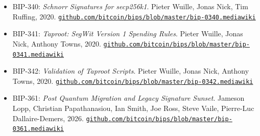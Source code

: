 \documentclass[11pt, twoside, openright]{book}
\begin{document}
\begin{itemize}[leftmargin=1.5em, itemsep=4pt]
  \item BIP-340: \textit{Schnorr Signatures for secp256k1}. Pieter Wuille, Jonas Nick, Tim Ruffing, 2020. \href{https://github.com/bitcoin/bips/blob/master/bip-0340.mediawiki}{\nolinkurl{github.com/bitcoin/bips/blob/master/bip-0340.mediawiki}}
  \item BIP-341: \textit{Taproot: SegWit Version 1 Spending Rules}. Pieter Wuille, Jonas Nick, Anthony Towns, 2020. \href{https://github.com/bitcoin/bips/blob/master/bip-0341.mediawiki}{\nolinkurl{github.com/bitcoin/bips/blob/master/bip-0341.mediawiki}}
  \item BIP-342: \textit{Validation of Taproot Scripts}. Pieter Wuille, Jonas Nick, Anthony Towns, 2020. \href{https://github.com/bitcoin/bips/blob/master/bip-0342.mediawiki}{\nolinkurl{github.com/bitcoin/bips/blob/master/bip-0342.mediawiki}}
  \item BIP-361: \textit{Post Quantum Migration and Legacy Signature Sunset}. Jameson Lopp, Christian Papathanasiou, Ian Smith, Joe Ross, Steve Vaile, Pierre-Luc Dallaire-Demers, 2026. \href{https://github.com/bitcoin/bips/blob/master/bip-0361.mediawiki}{\nolinkurl{github.com/bitcoin/bips/blob/master/bip-0361.mediawiki}}
\end{itemize}
\end{document}

